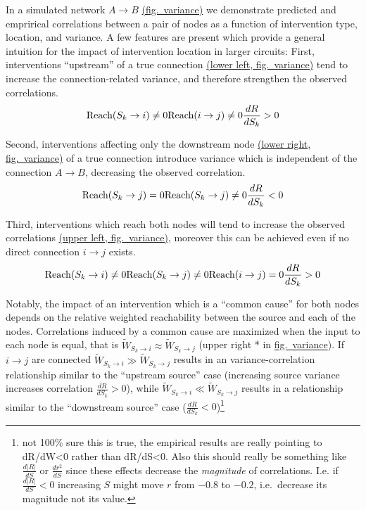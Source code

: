 In a simulated network \(A\rightarrow B\)
\protect\hyperlink{fig-var}{(fig.~variance)} we demonstrate predicted
and emprirical correlations between a pair of nodes as a function of
intervention type, location, and variance. A few features are present
which provide a general intuition for the impact of intervention
location in larger circuits: First, interventions ``upstream'' of a true
connection \protect\hyperlink{fig-var}{(lower left, fig.~variance)} tend
to increase the connection-related variance, and therefore strengthen
the observed correlations.
\[\text{Reach}(S_k\rightarrow i) \neq 0 \\ \text{Reach}(i\rightarrow j) \neq 0 \\ \frac{dR}{dS_k} > 0\]

Second, interventions affecting only the downstream node
\protect\hyperlink{fig-var}{(lower right, fig.~variance)} of a true
connection introduce variance which is independent of the connection
\(A\rightarrow B\), decreasing the observed correlation.
\[\text{Reach}(S_k \rightarrow  j) = 0 \\ \text{Reach}(S_k \rightarrow  j) \neq 0 \\ \frac{dR}{dS_k} < 0\]

Third, interventions which reach both nodes will tend to increase the
observed correlations \protect\hyperlink{fig-var}{(upper left,
fig.~variance)}, moreover this can be achieved even if no direct
connection \(i\rightarrow j\) exists.
\[\text{Reach}(S_k \rightarrow  i) \neq 0 \\ \text{Reach}(S_k \rightarrow  j) \neq 0 \\ \text{Reach}(i \rightarrow  j) = 0 \\ \frac{dR}{dS_k} > 0\]

Notably, the impact of an intervention which is a ``common cause'' for
both nodes depends on the relative weighted reachability between the
source and each of the nodes. Correlations induced by a common cause are
maximized when the input to each node is equal, that is
\(\widetilde{W}_{S_k\rightarrow i} \approx \widetilde{W}_{S_k\rightarrow j}\) (upper right *
in \protect\hyperlink{fig-var}{fig.~variance}). If \(i\rightarrow j\) are connected
\(\widetilde{W}_{S_k\rightarrow i} \gg \widetilde{W}_{S_k\rightarrow j}\) results in an
variance-correlation relationship similar to the ``upstream source''
case (increasing source variance increases correlation
\(\frac{dR}{dS_k} > 0\)), while
\(\widetilde{W}_{S_k\rightarrow i} \ll \widetilde{W}_{S_k\rightarrow j}\) results in a
relationship similar to the ``downstream source'' case
(\(\frac{dR}{dS_k} < 0\))\footnote{not 100\% sure this is true, the
  empirical results are really pointing to dR/dW\textless0 rather than
  dR/dS\textless0. Also this should really be something like
  \(\frac{d|R|}{dS}\) or \(\frac{dr^2}{dS}\) since these effects
  decrease the \emph{magnitude} of correlations. I.e. if
  \(\frac{d|R|}{dS} < 0\) increasing \(S\) might move \(r\) from
  \(-0.8\) to \(-0.2\), i.e.~decrease its magnitude not its value.}


